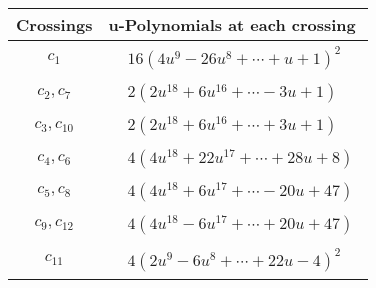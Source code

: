 \documentclass[1p]{elsarticle_modified}
\theoremstyle{definition}
\begin{document}
\begin{tabular}{m{50pt}|m{274pt}}
Crossings & \hspace{64pt}u-Polynomials at each crossing \\
\hline $$\begin{aligned}c_{1}\end{aligned}$$&$\begin{aligned}
&16(4 u^9-26 u^8+\cdots+u+1)^{2}
\end{aligned}$\\
\hline $$\begin{aligned}c_{2},c_{7}\end{aligned}$$&$\begin{aligned}
&2(2 u^{18}+6 u^{16}+\cdots-3 u+1)
\end{aligned}$\\
\hline $$\begin{aligned}c_{3},c_{10}\end{aligned}$$&$\begin{aligned}
&2(2 u^{18}+6 u^{16}+\cdots+3 u+1)
\end{aligned}$\\
\hline $$\begin{aligned}c_{4},c_{6}\end{aligned}$$&$\begin{aligned}
&4(4 u^{18}+22 u^{17}+\cdots+28 u+8)
\end{aligned}$\\
\hline $$\begin{aligned}c_{5},c_{8}\end{aligned}$$&$\begin{aligned}
&4(4 u^{18}+6 u^{17}+\cdots-20 u+47)
\end{aligned}$\\
\hline $$\begin{aligned}c_{9},c_{12}\end{aligned}$$&$\begin{aligned}
&4(4 u^{18}-6 u^{17}+\cdots+20 u+47)
\end{aligned}$\\
\hline $$\begin{aligned}c_{11}\end{aligned}$$&$\begin{aligned}
&4(2 u^9-6 u^8+\cdots+22 u-4)^{2}
\end{aligned}$\\
\hline
\end{tabular}\\~\\
\newpage\renewcommand{\arraystretch}{1}
\end{document}
